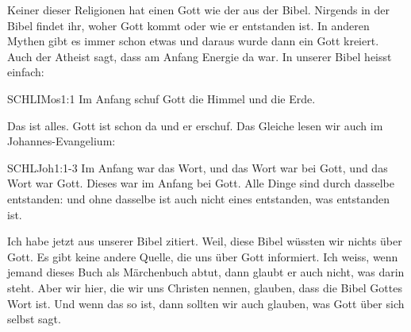 \begin{otsblock}
        Keiner dieser Religionen hat einen Gott wie der aus der Bibel. Nirgends in der Bibel findet ihr, woher Gott kommt oder wie er entstanden ist. In anderen Mythen gibt es immer schon etwas und daraus wurde dann ein Gott kreiert. Auch der Atheist sagt, dass am Anfang Energie da war. In unserer Bibel heisst einfach:
        \begin{bibelbox}{SCHL}{IMos}{1:1}
            Im Anfang schuf Gott die Himmel und die Erde.
        \end{bibelbox}
        Das ist alles. Gott ist schon da und er erschuf. Das Gleiche lesen wir auch im Johannes-Evangelium:
        \begin{bibelbox}{SCHL}{Joh}{1:1-3}
            Im Anfang war das Wort, und das Wort war bei Gott, und das Wort war Gott. Dieses war im Anfang bei Gott. Alle Dinge sind durch dasselbe entstanden: und ohne dasselbe ist auch nicht eines entstanden, was entstanden ist.
        \end{bibelbox}
        Ich habe jetzt aus unserer Bibel zitiert. Weil,  diese Bibel wüssten wir nichts über Gott. Es gibt keine andere Quelle, die uns über Gott informiert. Ich weiss, wenn jemand dieses Buch als Märchenbuch abtut, dann glaubt er auch nicht, was darin steht. Aber wir hier, die wir uns Christen nennen, glauben, dass die Bibel Gottes Wort ist. Und wenn das so ist, dann sollten wir auch glauben, was Gott über sich selbst sagt.


\end{otsblock}
